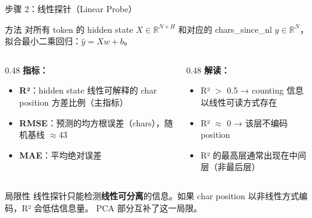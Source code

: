 \begin{frame}{步骤 2：线性探针（Linear Probe）}
\small
\begin{block}{方法}
对所有 token 的 hidden state $X \in \mathbb{R}^{N \times H}$ 和对应的 chars\_since\_nl $y \in \mathbb{R}^N$，
拟合最小二乘回归：$\hat{y} = Xw + b$。
\end{block}

\begin{columns}[T,onlytextwidth]
\begin{column}{0.48\linewidth}
\textbf{指标：}
\begin{itemize}
  \item \textbf{R²}：hidden state 线性可解释的 char position 方差比例（主指标）
  \item \textbf{RMSE}：预测的均方根误差（chars），随机基线 $\approx 43$
  \item \textbf{MAE}：平均绝对误差
\end{itemize}
\end{column}
\begin{column}{0.48\linewidth}
\textbf{解读：}
\begin{itemize}
  \item R² $>$ 0.5 → counting 信息以线性可读方式存在
  \item R² $\approx$ 0 → 该层不编码 position
  \item R² 的最高层通常出现在中间层（非最后层）
\end{itemize}
\end{column}
\end{columns}

\vspace{0.4em}
\begin{block}{局限性}
线性探针只能检测\textbf{线性可分离}的信息。如果 char position 以非线性方式编码，R² 会低估信息量。
PCA 部分互补了这一局限。
\end{block}
\end{frame}

